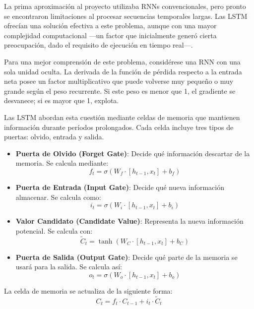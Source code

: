 La prima aproximación al proyecto utilizaba RNNs convencionales, pero pronto se encontraron limitaciones al procesar secuencias temporales largas. Las LSTM ofrecían una solución efectiva a este problema, aunque con una mayor complejidad computacional —un factor que inicialmente generó cierta preocupación, dado el requisito de ejecución en tiempo real—.

Para una mejor comprensión de este problema, considérese una RNN con una sola unidad oculta. La derivada de la función de pérdida respecto a la entrada neta posee un factor multiplicativo que puede volverse muy pequeño o muy grande según el peso recurrente. Si este peso es menor que 1, el gradiente se desvanece; si es mayor que 1, explota.

Las LSTM abordan esta cuestión mediante celdas de memoria que mantienen información durante períodos prolongados. Cada celda incluye tres tipos de puertas: olvido, entrada y salida.

\begin{itemize}
    \item \textbf{Puerta de Olvido (Forget Gate)}: Decide qué información descartar de la memoria. Se calcula mediante:
    \begin{equation}
        f_t = \sigma(W_f \cdot [h_{t-1}, x_t] + b_f)
    \end{equation}
    \item \textbf{Puerta de Entrada (Input Gate)}: Decide qué nueva información almacenar. Se calcula como:
    \begin{equation}
        i_t = \sigma(W_i \cdot [h_{t-1}, x_t] + b_i)
    \end{equation}
    \item \textbf{Valor Candidato (Candidate Value)}: Representa la nueva información potencial. Se calcula con:
    \begin{equation}
        \tilde{C}_t = \tanh(W_C \cdot [h_{t-1}, x_t] + b_C)
    \end{equation}
    \item \textbf{Puerta de Salida (Output Gate)}: Decide qué parte de la memoria se usará para la salida. Se calcula así:
    \begin{equation}
        o_t = \sigma(W_o \cdot [h_{t-1}, x_t] + b_o)
    \end{equation}
\end{itemize}

La celda de memoria se actualiza de la siguiente forma:
\begin{equation}
    C_t = f_t \cdot C_{t-1} + i_t \cdot \tilde{C}_t
\end{equation}

